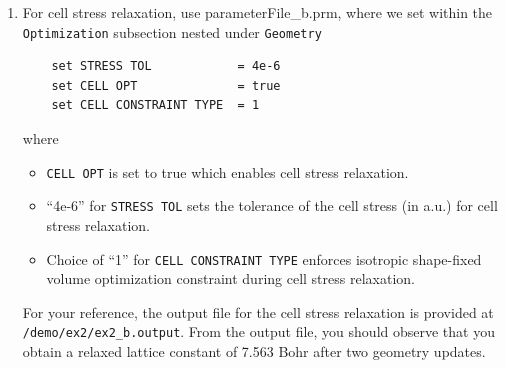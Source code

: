 \begin{enumerate}
\item For cell stress relaxation, use parameterFile\_b.prm, where we set within the \verb|Optimization| subsection nested under \verb|Geometry|
\begin{verbatim}
    set STRESS TOL            = 4e-6
    set CELL OPT              = true
    set CELL CONSTRAINT TYPE  = 1
\end{verbatim}
where
\begin{itemize}
\item \verb|CELL OPT| is set to true which enables cell stress relaxation.  		
\item ``4e-6'' for \verb|STRESS TOL| sets the tolerance of the cell stress (in a.u.) for cell stress relaxation.
\item Choice of ``1'' for \verb|CELL CONSTRAINT TYPE| enforces isotropic shape-fixed volume optimization constraint during cell stress relaxation.
\end{itemize}
For your reference, the output file for the cell stress relaxation is provided at \verb|/demo/ex2/ex2_b.output|. From the output file, you should observe that you obtain a relaxed lattice constant of 7.563 Bohr after two geometry updates. 
\end{enumerate}

